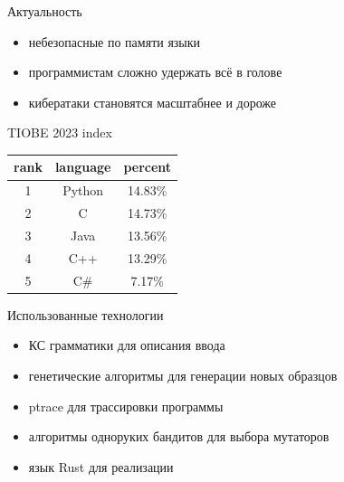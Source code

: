 \documentclass[hyperref={unicode=true}, 12pt]{beamer}
\begin{document}
	\begin{frame}{Актуальность}
		\begin{minipage}{0.53\textwidth}
			\raggedright
			\begin{itemize}
				
				\fontsize{12}{15}
				
				\item небезопасные по памяти языки
				
				\item программистам сложно удержать всё в голове
				
				\item кибератаки становятся масштабнее и дороже
			\end{itemize}
		
		\end{minipage}\begin{minipage}{0.47\textwidth}
			\centering
			TIOBE 2023 index
			
			\vspace{0.1cm}
			\begin{tabular}{|c|c|c|}
				\hline
				rank & language & percent \\
				\hline
				1 & Python & 14.83\% \\
				\hline
				2 & C & 14.73\% \\
				\hline
				3 & Java & 13.56\% \\
				\hline
				4 & C++ & 13.29\% \\
				\hline
				5 & C\# & 7.17\% \\
				\hline
			\end{tabular}
		\end{minipage}
		
	\end{frame}

	\begin{frame}[t]{Использованные технологии}
			\vspace{1cm}
		\begin{itemize}
			\fontsize{14}{18}
			\selectfont
			\item КС грамматики для описания ввода
			\item генетические алгоритмы для генерации новых образцов
			\item ptrace для трассировки программы
			\item алгоритмы одноруких бандитов для выбора мутаторов
			\item язык Rust для реализации
		\end{itemize}
		
	\end{frame}
\end{document}
